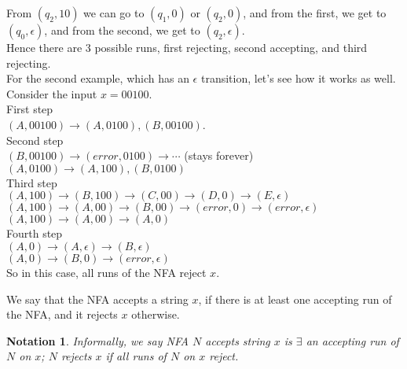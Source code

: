 \documentclass[a4paper]{article}
\newtheorem{notn}{Notation}
\begin{document}
From $(q_2, 10)$ we can go to $(q_1, 0)$ or $(q_2, 0)$, and from the first, we get to $(q_0, \epsilon)$, and from the second, we get to $(q_2, \epsilon)$.\\

Hence there are 3 possible runs, first rejecting, second accepting, and third rejecting.\\

For the second example, which has an $\epsilon$ transition, let's see how it works as well.\\

Consider the input $x = 00100$.\\

First step\\
$(A, 00100) \to (A, 0100), (B, 00100)$.\\

Second step\\
$(B, 00100) \to (error, 0100) \to \cdots$ (stays forever)\\
$(A, 0100) \to (A, 100), (B, 0100)$\\

Third step\\
$(A, 100) \to (B, 100) \to (C, 00) \to (D, 0) \to (E, \epsilon)$\\
$(A, 100) \to (A, 00) \to (B, 00) \to (error, 0) \to (error, \epsilon)$\\
$(A, 100) \to (A, 00) \to (A, 0)$\\

Fourth step\\
$(A, 0) \to (A, \epsilon) \to (B, \epsilon)$\\
$(A, 0) \to (B, 0) \to (error, \epsilon)$\\

So in this case, all runs of the NFA reject $x$.

We say that the NFA accepts a string $x$, if there is at least one accepting run of the NFA, and it rejects $x$ otherwise.

\begin{notn}
    Informally, we say NFA $N$ accepts string $x$ is $\exists$ an accepting run of $N$ on $x$; $N$ rejects $x$ if all runs of $N$ on $x$ reject.
\end{notn}
\end{document}
